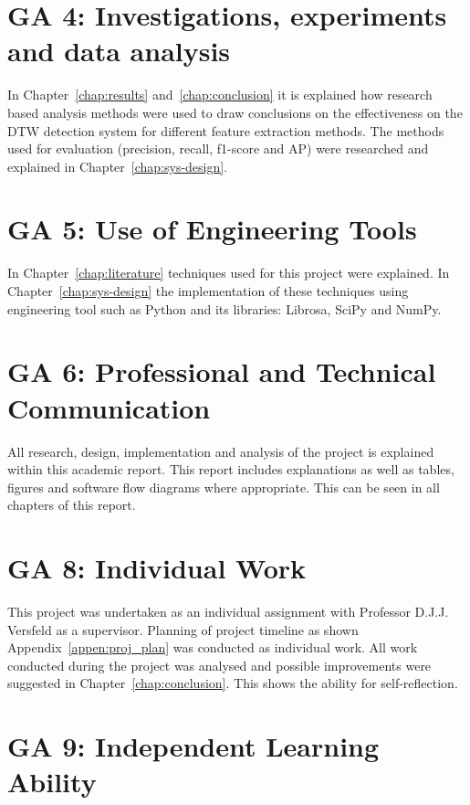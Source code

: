 \section{GA 4: Investigations, experiments and data analysis}\label{sec:ga_4}

In Chapter~\ref{chap:results} and~\ref{chap:conclusion} it is explained 
how research based analysis methods were used to draw conclusions on 
the effectiveness on the \acs{DTW} detection system for different feature extraction 
methods. The methods used for evaluation (precision, recall, f1-score and \acs{AP}) 
were researched and explained in Chapter~\ref{chap:sys-design}.


\section{GA 5: Use of Engineering Tools}\label{sec:ga_5}

In Chapter~\ref{chap:literature} techniques used for this project were 
explained. In Chapter~\ref{chap:sys-design} the implementation of these 
techniques using engineering tool such as Python and its libraries: 
Librosa, SciPy and NumPy.


\section{GA 6: Professional and Technical Communication}\label{sec:ga_6}

All research, design, implementation and analysis of the project is 
explained within this academic report. This report includes explanations 
as well as tables, figures and software flow diagrams where appropriate.
This can be seen in all chapters of this report.

\section{GA 8: Individual Work}\label{sec:ga_8}

This project was undertaken as an individual assignment with Professor 
D.J.J. Versfeld as a supervisor. Planning of project timeline as shown Appendix~\ref{appen:proj_plan} 
was conducted as individual work. All work conducted during the project was 
analysed and possible improvements were suggested in Chapter~\ref{chap:conclusion}. This 
shows the ability for self-reflection.

\section{GA 9: Independent Learning Ability}\label{sec:ga_9}

